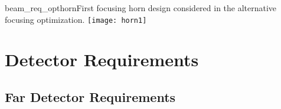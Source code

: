 \begin{cdrfigure}{beam_req_opthorn}{First focusing horn design considered 
    in the alternative focusing optimization. 
}
  \texttt{[image: horn1]}
\end{cdrfigure}


\section{Detector Requirements}
\label{sec:physics-lbnosc-det-req}

\subsection{Far Detector Requirements}
\label{sec:physics-lbnosc-fd-req}

